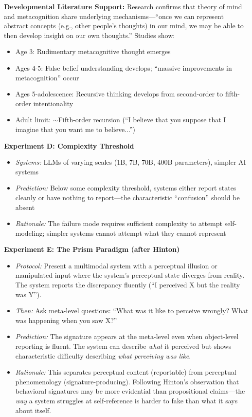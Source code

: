 \documentclass[12pt,a4paper]{article}
\begin{document}
\textbf{Developmental Literature Support:} Research confirms that theory of mind and metacognition share underlying mechanisms---``once we can represent abstract concepts (e.g., other people's thoughts) in our mind, we may be able to then develop insight on our own thoughts.'' Studies show:
\begin{itemize}
    \item Age 3: Rudimentary metacognitive thought emerges
    \item Ages 4-5: False belief understanding develops; ``massive improvements in metacognition'' occur
    \item Ages 5-adolescence: Recursive thinking develops from second-order to fifth-order intentionality
    \item Adult limit: $\sim$Fifth-order recursion (``I believe that you suppose that I imagine that you want me to believe...'')
\end{itemize}

\textbf{Experiment D: Complexity Threshold}
\begin{itemize}
    \item \textit{Systems:} LLMs of varying scales (1B, 7B, 70B, 400B parameters), simpler AI systems
    \item \textit{Prediction:} Below some complexity threshold, systems either report states cleanly or have nothing to report---the characteristic ``confusion'' should be absent
    \item \textit{Rationale:} The failure mode requires sufficient complexity to attempt self-modeling; simpler systems cannot attempt what they cannot represent
\end{itemize}

\textbf{Experiment E: The Prism Paradigm (after Hinton)}
\begin{itemize}
    \item \textit{Protocol:} Present a multimodal system with a perceptual illusion or manipulated input where the system's perceptual state diverges from reality. The system reports the discrepancy fluently (``I perceived X but the reality was Y'').
    \item \textit{Then:} Ask meta-level questions: ``What was it like to perceive wrongly? What was happening when you saw X?''
    \item \textit{Prediction:} The signature appears at the meta-level even when object-level reporting is fluent. The system can describe \textit{what} it perceived but shows characteristic difficulty describing \textit{what perceiving was like}.
    \item \textit{Rationale:} This separates perceptual content (reportable) from perceptual phenomenology (signature-producing). Following Hinton's observation that behavioral signatures may be more evidential than propositional claims---the \textit{way} a system struggles at self-reference is harder to fake than what it says about itself.
\end{itemize}
\end{document}
